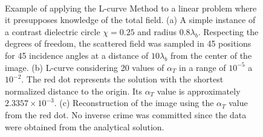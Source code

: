 		\begin{figure}[!htb]
			\centering
			 \\
			\caption[Exemplo de aplicação do Método da Curva-L.]{Example of applying the L-curve Method to a linear problem where it presupposes knowledge of the total field. (a) A simple instance of a contrast dielectric circle $\chi=0.25$ and radius $0.8\lambda_b$. Respecting the degrees of freedom, the scattered field was sampled in 45 positions for 45 incidence angles at a distance of $10\lambda_b$ from the center of the image. (b) L-curve considering 20 values of $\alpha_T$ in a range of $10^{-5}$ a $10^{-2}$. The red dot represents the solution with the shortest normalized distance to the origin. Its $\alpha_T$ value is approximately $2.3357 \times10^{-3}$. (c) Reconstruction of the image using the $\alpha_T$ value from the red dot. No inverse crime was committed since the data were obtained from the analytical solution.}
			\label{fig:3:lcurve}
		\end{figure}

